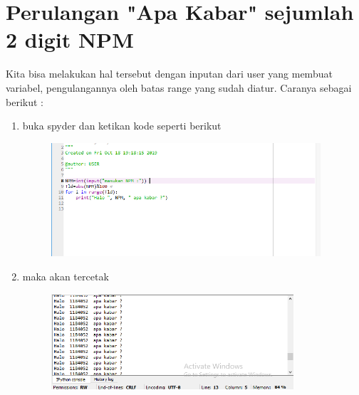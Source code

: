 \chapter*{Perulangan "Apa Kabar" sejumlah 2 digit NPM }

\par
Kita bisa melakukan hal tersebut dengan inputan dari user yang membuat variabel, pengulangannya oleh batas range yang sudah diatur. Caranya sebagai berikut :


\begin{enumerate}
   

\item buka spyder dan ketikan kode seperti berikut
	\begin{figure} [h]
	\includegraphics[width=10cm]{pakabs/pakabs.png}
	\centering
	\end{figure}
	
	
	
 \item maka akan tercetak 
 \begin{figure} [h]
	\includegraphics[width=9cm]{pakabs/pakabs2.png}
	\centering
	\end{figure}
 
	
	\end{enumerate}